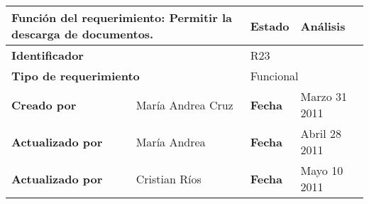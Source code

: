 %
\begin{center}
\begin{longtable}{|p{}|p{}|p{}|p{}|}
\hline
\multicolumn{2}{|p{0.45\textwidth}|}{{\bf {Función del requerimiento:}}
Permitir la descarga de documentos. } & {\bf{ Estado}} & Análisis \\
\hline
\multicolumn{2}{|p{0.45\textwidth}}{\bf Identificador} &
\multicolumn{2}{|p{0.45\textwidth}|}{R23} \\
\hline
\multicolumn{2}{|p{0.45\textwidth}}{\bf {Tipo de requerimiento}} &
\multicolumn{2}{|p{0.45\textwidth}|}{Funcional}\\
\hline
\bf {Creado por} & María Andrea Cruz & \bf {Fecha  } & Marzo 31 2011\\
\hline
\bf {Actualizado por} & María Andrea   & \bf {Fecha   }& Abril 28 2011\\
\hline
\bf {Actualizado por} & Cristian Ríos   & \bf {Fecha   }& Mayo 10 2011\\


\end{longtable}
\end{center}
